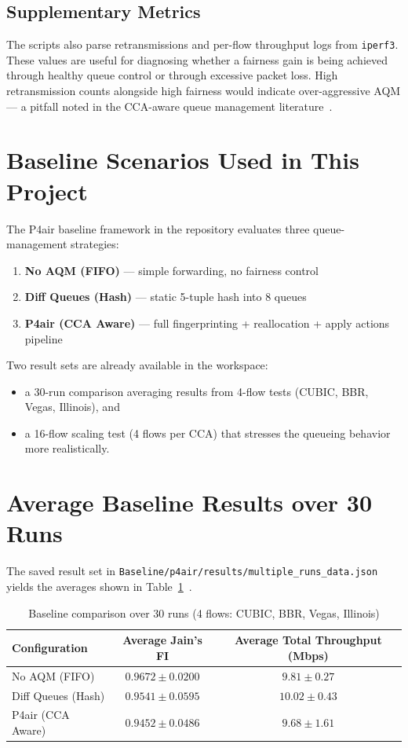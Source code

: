 \documentclass[12pt,a4paper]{report}
\begin{document}
\subsection{Supplementary Metrics}
The scripts also parse retransmissions and per-flow throughput logs from \texttt{iperf3}. These values are useful for diagnosing whether a fairness gain is being achieved through healthy queue control or through excessive packet loss. High retransmission counts alongside high fairness would indicate over-aggressive AQM — a pitfall noted in the CCA-aware queue management literature~\cite{ccaaware}.

\section{Baseline Scenarios Used in This Project}
The P4air baseline framework in the repository evaluates three queue-management strategies:
\begin{enumerate}
    \item \textbf{No AQM (FIFO)} — simple forwarding, no fairness control
    \item \textbf{Diff Queues (Hash)} — static 5-tuple hash into 8 queues
    \item \textbf{P4air (CCA Aware)} — full fingerprinting + reallocation + apply actions pipeline~\cite{p4air}
\end{enumerate}

Two result sets are already available in the workspace:
\begin{itemize}
    \item a 30-run comparison averaging results from 4-flow tests (CUBIC, BBR, Vegas, Illinois), and
    \item a 16-flow scaling test (4 flows per CCA) that stresses the queueing behavior more realistically.
\end{itemize}

\section{Average Baseline Results over 30 Runs}
The saved result set in \texttt{Baseline/p4air/results/multiple\_runs\_data.json} yields the averages shown in Table~\ref{tab:baseline_30_runs}~\cite{repo}.

\begin{table}[H]
\centering
\caption{Baseline comparison over 30 runs (4 flows: CUBIC, BBR, Vegas, Illinois)}
\label{tab:baseline_30_runs}
\renewcommand{\arraystretch}{1.3}
\begin{tabular}{@{}lcc@{}}
\toprule
\textbf{Configuration} & \textbf{Average Jain's FI} & \textbf{Average Total Throughput (Mbps)} \\
\midrule
No AQM (FIFO) & $0.9672 \pm 0.0200$ & $9.81 \pm 0.27$ \\
Diff Queues (Hash) & $0.9541 \pm 0.0595$ & $10.02 \pm 0.43$ \\
P4air (CCA Aware) & $0.9452 \pm 0.0486$ & $9.68 \pm 1.61$ \\
\bottomrule
\end{tabular}
\end{table}
\end{document}
